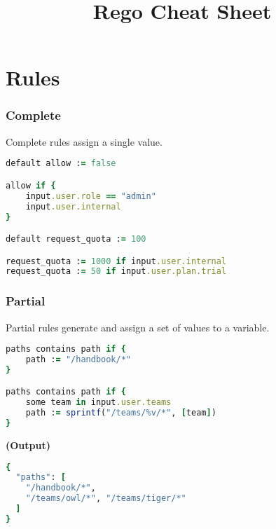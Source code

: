 \documentclass[twocolumn]{article}
\makeatletter
\renewcommand{\maketitle}{\bgroup\setlength{\parindent}{0pt}
\textbf{\LARGE{\@title}}
}
\makeatother
\begin{document}
\pagestyle{logo}
\title{Rego Cheat Sheet}

\maketitle
\vspace{-1em}





\section*{Rules  }




\vspace{-1em}
\subsubsection*{Complete}


\footnotesize{Complete rules assign a single value. 
}


\begin{lstlisting}[language=Ruby]
default allow := false

allow if {
	input.user.role == "admin"
	input.user.internal
}

default request_quota := 100

request_quota := 1000 if input.user.internal
request_quota := 50 if input.user.plan.trial
\end{lstlisting}





\vspace{-1em}
\subsubsection*{Partial}


\footnotesize{Partial rules generate and assign a set of values to a variable.}


\begin{lstlisting}[language=Ruby]
paths contains path if {
	path := "/handbook/*"
}

paths contains path if {
	some team in input.user.teams
	path := sprintf("/teams/%v/*", [team])
}
\end{lstlisting}



\textbf{\tiny{(Output)}}
\begin{lstlisting}[language=Ruby]
{
  "paths": [
    "/handbook/*",
    "/teams/owl/*", "/teams/tiger/*"
  ]
}
\end{lstlisting}
\end{document}
